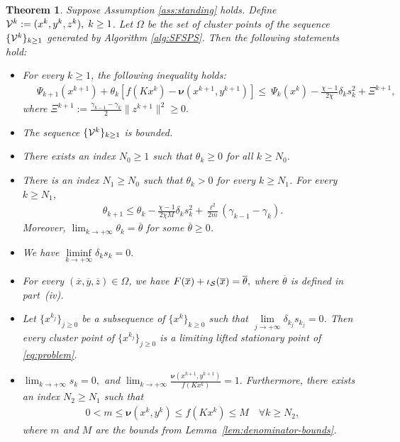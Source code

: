 \documentclass[9pt]{article}
\numberwithin{equation}{section}
\newtheorem{theorem}{Theorem}[section]
\theoremstyle{definition}
\theoremstyle{remark}
\newcommand{\nuf}{\boldsymbol\nu}
\DeclareMathOperator{\dom}{dom}
\begin{document}
\begin{theorem}
\label{PriTheo2R}
Suppose Assumption \ref{ass:standing} holds. Define ${\cal V}^k := (x^k,y^k,z^k), \; k\geq 1$. Let $\Omega$ be the set of  cluster points of the sequence $\{{\cal V}^k\}_{k\ge 1}$ generated by Algorithm \ref{alg:SFSPS}.  Then the following statements hold:
\begin{itemize}
\item[(i)] For every $k \geq 1$, the following inequality holds:
\begin{eqnarray*}
& \ \Psi_{k+1}({ x}^{k+1})
+ \theta_k \left[f(K{ x}^k)-\nuf({ x}^{k+1},{ y}^{k+1})\right]
\leq \ \Psi_k({ x}^{k})
-\frac{\chi-1}{2\chi}\delta_k s_k^2 + \Xi^{k+1},
\end{eqnarray*}
 where
$
\Xi^{k+1} := \frac{\gamma_{k-1}-\gamma_{k}}{2}\|{ z}^{k+1}\|^2 \geq 0.
$

\item[(ii)] The sequence $\{{\cal V}^k\}_{k\ge 1}$ is bounded.
\item[(iii)] There exists an index $N_0\geq1$ such that $\theta_k\ge 0$ for all $k\geq N_0$.
\item[(iv)] There is an index $N_1\geq N_0$ such that $\theta_k>0$ for every
$k\geq N_1$.
For every $k\geq N_1$,
\begin{eqnarray}\label{eq:theta-quasidescent}
 \theta_{k+1}
 \leq \theta_k-\frac{\chi-1}{2\chi M}\delta_k s_k^2
 +\frac{\ell^2}{2m}(\gamma_{k-1}-\gamma_{k}).
\end{eqnarray}
Moreover, $\lim_{k\to+\infty}\theta_k=\overline{\theta}$
for some $\overline{\theta}\geq0$.
\item[(v)] We have $\liminf\limits_{k\to+\infty}\delta_{k}s_k=0.$
\end{itemize}
\begin{itemize}
\item[(vi)]
{For every $(\overline{ x},{\overline{ y}},{\overline{ z}}) \in \Omega$, we have }
$F(\overline x)+\iota_{\cal S}(\overline x)={\overline{ \theta}},$
{where $\overline{\theta}$ is defined in part~(iv)}.
\item[(vii)]
Let \(\{{ x}^{k_j}\}_{j\ge 0}\) be a subsequence of $\{x^k\}_{k\ge 0}$ such that
$
\lim\limits_{j \to +\infty} \delta_{k_j} s_{k_j} = 0$.  Then every cluster point of $\{x^{k_j}\}_{j\ge 0}$ is a limiting lifted stationary point of \eqref{eq:problem}.
\item[(viii)]  $
    \lim_{k\to+\infty}s_k=0,$
    and
$\displaystyle \lim_{k\to+\infty}\frac{\nuf(x^{k+1},y^{k+1})}{f(K{x}^{k})}=1.$ %
Furthermore, there exists an index $N_2\geq N_1$ such that
\begin{eqnarray}\label{K1}
0<m\le \nuf(x^k,y^k) \le f(K{ x}^k)\le M \quad \forall k \geq N_2,
\end{eqnarray}
where $m$ and $M$ are the bounds from Lemma~\ref{lem:denominator-bounds}.
\end{itemize}
\end{theorem}
\end{document}

